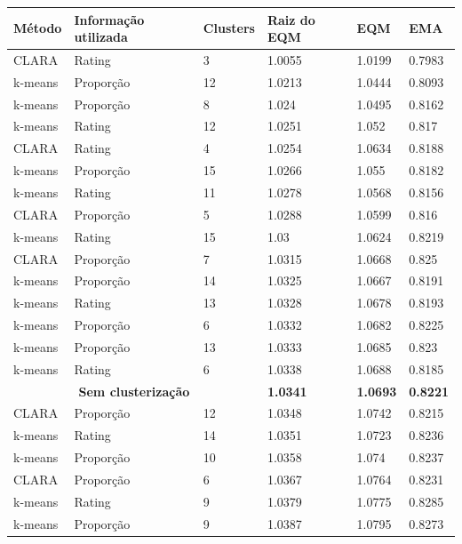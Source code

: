 \documentclass[12pt,a4paper,header]{abnt}
\begin{document}
\begin{longtable}{l|l|l|l|l|l}
\hline
\textbf{Método}   & \textbf{Informação utilizada}  & \textbf{Clusters}  & \textbf{Raiz do EQM}   & \textbf{EQM}    & \textbf{EMA}    \\
\hline
\endhead
%
CLARA    & Rating         & 3         & 1.0055 & 1.0199 & 0.7983 \\
k-means   & Proporção      & 12        & 1.0213 & 1.0444 & 0.8093 \\
k-means   & Proporção      & 8         & 1.024  & 1.0495 & 0.8162 \\
k-means   & Rating         & 12        & 1.0251 & 1.052  & 0.817  \\
CLARA    & Rating         & 4         & 1.0254 & 1.0634 & 0.8188 \\
k-means   & Proporção      & 15        & 1.0266 & 1.055  & 0.8182 \\
k-means   & Rating         & 11        & 1.0278 & 1.0568 & 0.8156 \\
CLARA    & Proporção      & 5         & 1.0288 & 1.0599 & 0.816  \\
k-means   & Rating         & 15        & 1.03   & 1.0624 & 0.8219 \\
CLARA    & Proporção      & 7         & 1.0315 & 1.0668 & 0.825  \\
k-means   & Proporção      & 14        & 1.0325 & 1.0667 & 0.8191 \\
k-means   & Rating         & 13        & 1.0328 & 1.0678 & 0.8193 \\
k-means   & Proporção      & 6         & 1.0332 & 1.0682 & 0.8225 \\
k-means   & Proporção      & 13        & 1.0333 & 1.0685 & 0.823  \\
k-means   & Rating         & 6         & 1.0338 & 1.0688 & 0.8185 \\
\multicolumn{3}{c}{\textbf{Sem clusterização}} & \textbf{1.0341} & \textbf{1.0693} & \textbf{0.8221} \\
CLARA    & Proporção      & 12        & 1.0348 & 1.0742 & 0.8215 \\
k-means   & Rating         & 14        & 1.0351 & 1.0723 & 0.8236 \\
k-means   & Proporção      & 10        & 1.0358 & 1.074  & 0.8237 \\
CLARA    & Proporção      & 6         & 1.0367 & 1.0764 & 0.8231 \\
k-means   & Rating         & 9         & 1.0379 & 1.0775 & 0.8285 \\
k-means   & Proporção      & 9         & 1.0387 & 1.0795 & 0.8273 \\

\end{longtable}
\end{document}
